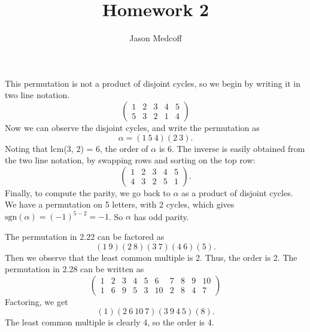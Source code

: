 \documentclass{amsart}
\author{Jason Medcoff}
\date{}
\title{Homework 2}
\begin{document}
	
	\maketitle
	
	This permutation is not a product of disjoint cycles, so we begin by writing it in two line notation.
	$$ \begin{pmatrix}
	1 & 2 & 3 & 4 & 5 \\
	5 & 3 & 2 & 1 & 4
	\end{pmatrix} $$
	Now we can observe the disjoint cycles, and write the permutation as
	$$ \alpha = (1\ 5\ 4)(2\ 3) . $$
	Noting that lcm(3, 2) = 6, the order of $\alpha$ is 6. The inverse is easily obtained from the two line notation, by swapping rows and sorting on the top row:
	$$ \begin{pmatrix}
	1 & 2 & 3 & 4 & 5 \\
	4 & 3 & 2 & 5 & 1
	\end{pmatrix} . $$
	Finally, to compute the parity, we go back to $\alpha$ as a product of disjoint cycles. We have a permutation on 5 letters, with 2 cycles, which gives $\text{sgn}(\alpha) = (-1)^{5-2} = -1$. So $\alpha$ has odd parity.
	
	The permutation in 2.22 can be factored as $$ (1\ 9)(2\ 8)(3\ 7)(4\ 6)(5) . $$
	Then we observe that the least common multiple is 2. Thus, the order is 2.
	The permutation in 2.28 can be written as
	$$ \begin{pmatrix}
	1 & 2 & 3 & 4 & 5 & 6 & 7 & 8 & 9 & 10 \\
	1 & 6 & 9 & 5 & 3 & 10 & 2 & 8 & 4 & 7
	\end{pmatrix} $$
	Factoring, we get
	$$ (1)(2\ 6\ 10\ 7)(3\ 9\ 4\ 5)(8) . $$
	The least common multiple is clearly 4, so the order is 4.
	
\end{document}
